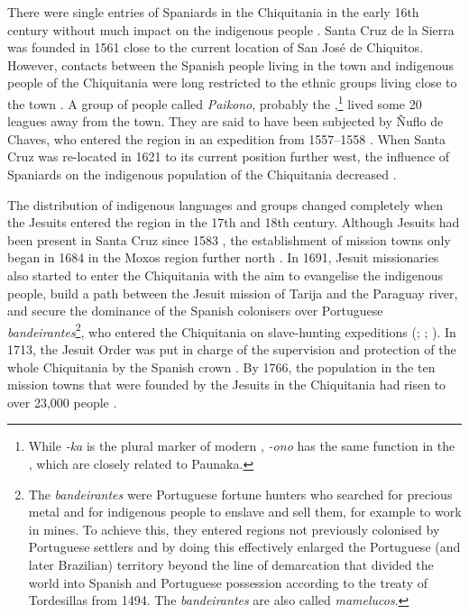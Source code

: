 There were single entries of Spaniards in the Chiquitania in the early 16th century  without much impact on the indigenous people  \citep[cf.][25--29]{Tonelli2004}. Santa Cruz de la Sierra was founded in 1561 close to the current location of San José de Chiquitos. However, contacts between the Spanish people living in the town and indigenous people of the Chiquitania were long restricted to the ethnic groups living close to the town \citep[219--220]{TomichaCharupa2002}. A group of people called \textit{Paikono}, probably the ,\footnote{While \textit{-ka} is the plural marker of modern , \textit{-ono} has the same function in the , which are closely related to Paunaka.} lived some 20 leagues away from the town. They are said to have been subjected by Ñuflo de Chaves, who entered the region in an expedition from 1557–1558 \citep[118, 121-122]{Metraux1942}. When Santa Cruz was re-located in 1621 to its current position further west, the influence of Spaniards on the indigenous population of the Chiquitania decreased \citep[48]{Tonelli2004}.%

\hspace*{-3.2pt}The distribution of indigenous languages and groups changed completely when the Jesuits entered the region in the 17th and 18th century. Although Jesuits had been present in Santa Cruz since 1583 \citep[47]{Tonelli2004}, the establishment of mission towns only began in 1684 in the Moxos region further north \citep[47]{Tonelli2004}. In 1691, Jesuit missionaries also started to enter the Chiquitania with the aim to evangelise the indigenous people, build a path between the Jesuit mission of Tarija and the Paraguay river, %
 and secure the dominance of the Spanish colonisers over Portuguese \textit{bandeirantes}\footnote{The \textit{bandeirantes} were Portuguese fortune hunters who searched for precious metal and for indigenous people to enslave and sell them, for example to work in mines. To achieve this, they entered regions not previously colonised by Portuguese settlers and by doing this effectively enlarged the Portuguese (and later Brazilian) territory beyond the line of demarcation that divided the world into Spanish and Portuguese possession according to the treaty of Tordesillas from 1494. The \textit{bandeirantes} are also called \textit{mamelucos}.}, who entered the Chiquitania on slave-hunting expeditions  (\citealt[46]{APCOB_Saberes}; \citealt[528]{TomichaCharupa2002}; \citealt[66]{Tonelli2004}). %
In 1713, the Jesuit Order was put in charge of the supervision and protection of the whole Chi\-qui\-tania by the Spanish crown \citep[66]{Tonelli2004}. By 1766, the population in the ten mission towns that were founded by the Jesuits in the Chiquitania had risen to over 23,000 people \citep[77]{Tonelli2004}.%

